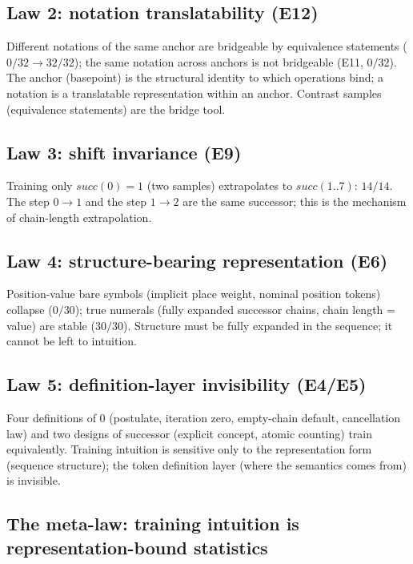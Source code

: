\documentclass[sigplan,10pt,anonymous,review]{acmart}
\begin{document}
\subsection{Law 2: notation translatability (E12)}

Different notations of the same anchor are bridgeable by equivalence
statements ($0/32 \to 32/32$); the same notation across anchors is not
bridgeable (E11, $0/32$). The anchor (basepoint) is the structural
identity to which operations bind; a notation is a translatable
representation within an anchor. Contrast samples (equivalence
statements) are the bridge tool.

\subsection{Law 3: shift invariance (E9)}

Training only $\mathit{succ}(0) = 1$ (two samples) extrapolates to
$\mathit{succ}(1..7)$: $14/14$. The step $0 \to 1$ and the step
$1 \to 2$ are the same successor; this is the mechanism of chain-length
extrapolation.

\subsection{Law 4: structure-bearing representation (E6)}

Position-value bare symbols (implicit place weight, nominal position
tokens) collapse ($0/30$); true numerals (fully expanded successor
chains, chain length = value) are stable ($30/30$). Structure must be
fully expanded in the sequence; it cannot be left to intuition.

\subsection{Law 5: definition-layer invisibility (E4/E5)}

Four definitions of 0 (postulate, iteration zero, empty-chain default,
cancellation law) and two designs of successor (explicit concept,
atomic counting) train equivalently. Training intuition is sensitive
only to the representation form (sequence structure); the token
definition layer (where the semantics comes from) is invisible.

\subsection{The meta-law: training intuition is representation-bound statistics}
\end{document}
